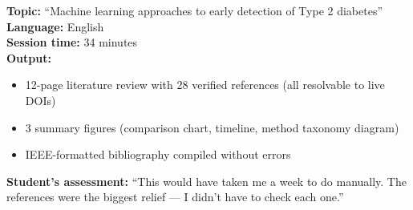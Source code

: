 \begin{keybox}[title=Real Session Example: Master's Thesis Literature Review]
\textbf{Topic:} ``Machine learning approaches to early detection of Type 2 diabetes''\\
\textbf{Language:} English\\
\textbf{Session time:} 34 minutes\\
\textbf{Output:}
\begin{itemize}[noitemsep]
  \item 12-page literature review with 28 verified references (all resolvable to live DOIs)
  \item 3 summary figures (comparison chart, timeline, method taxonomy diagram)
  \item IEEE-formatted bibliography compiled without errors
\end{itemize}
\textbf{Student's assessment:} ``This would have taken me a week to do manually.
The references were the biggest relief — I didn't have to check each one.''
\end{keybox}


